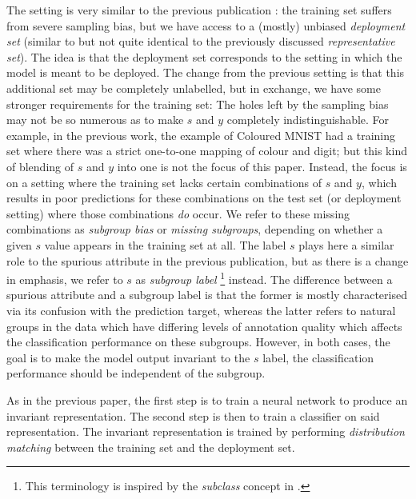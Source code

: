 The setting is very similar to the previous publication \citep{kehrenberg2020nullsampling}:
the training set suffers from severe sampling bias, but we have access to a (mostly) unbiased \emph{deployment set}
(similar to but not quite identical to the previously discussed \emph{representative set}).
The idea is that the deployment set corresponds to the setting in which the model is meant to be deployed.
The change from the previous setting is that this additional set may be completely unlabelled,
but in exchange, we have some stronger requirements for the training set:
The holes left by the sampling bias may not be so numerous
as to make \(s\) and \(y\) completely indistinguishable.
For example, in the previous work, the example of Coloured MNIST had a training set
where there was a strict one-to-one mapping of colour and digit;
but this kind of blending of \(s\) and \(y\) into one is not the focus of this paper.
Instead, the focus is on a setting where the training set lacks certain combinations of \(s\) and \(y\),
which results in poor predictions for these combinations on the test set (or deployment setting)
where those combinations \emph{do} occur.
We refer to these missing combinations as \emph{subgroup bias} or \emph{missing subgroups},
depending on whether a given \(s\) value appears in the training set at all.
The label \(s\) plays here a similar role to the spurious attribute in the previous publication,
but as there is a change in emphasis, we refer to \(s\) as \emph{subgroup label}%
\footnote{This terminology is inspired by the \emph{subclass} concept in \citet{SohDunAngGuetal20}.}
instead.
The difference between a spurious attribute and a subgroup label is that
the former is mostly characterised via its confusion with the prediction target,
whereas the latter refers to natural groups in the data
which have differing levels of annotation quality which affects the classification performance on these subgroups.
However, in both cases, the goal is to make the model output invariant to the \(s\) label,
\ie the classification performance should be independent of the subgroup.

As in the previous paper, the first step is to train a neural network to produce an invariant representation.
The second step is then to train a classifier on said representation.
The invariant representation is trained by performing \emph{distribution matching} between the training set and the deployment set.

